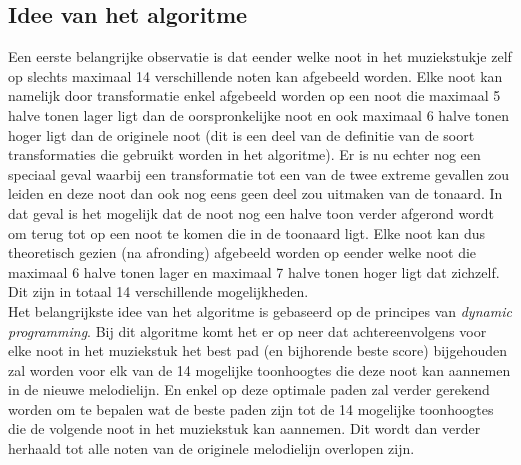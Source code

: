 \subsection{Idee van het algoritme}
Een eerste belangrijke observatie is dat eender welke noot in het muziekstukje zelf op slechts maximaal 14 verschillende noten kan afgebeeld worden. Elke noot kan namelijk door transformatie enkel afgebeeld worden op een noot die maximaal 5 halve tonen lager ligt dan de oorspronkelijke noot en ook maximaal 6 halve tonen hoger ligt dan de originele noot (dit is een deel van de definitie van de soort transformaties die gebruikt worden in het algoritme). Er is nu echter nog een speciaal geval waarbij een transformatie tot een van de twee extreme gevallen zou leiden en deze noot dan ook nog eens geen deel zou uitmaken van de tonaard. In dat geval is het mogelijk dat de noot nog een halve toon verder afgerond wordt om terug tot op een noot te komen die in de toonaard ligt. Elke noot kan dus theoretisch gezien (na afronding) afgebeeld worden op eender welke noot die maximaal 6 halve tonen lager en maximaal 7 halve tonen hoger ligt dat zichzelf. Dit zijn in totaal 14 verschillende mogelijkheden.\\
Het belangrijkste idee van het algoritme is gebaseerd op de principes van \textit{dynamic programming}. Bij dit algoritme komt het er op neer dat achtereenvolgens voor elke noot in het muziekstuk het best pad (en bijhorende beste score) bijgehouden zal worden voor elk van de 14 mogelijke toonhoogtes die deze noot kan aannemen in de nieuwe melodielijn. En enkel op deze optimale paden zal verder gerekend worden om te bepalen wat de beste paden zijn tot de 14 mogelijke toonhoogtes die de volgende noot in het muziekstuk kan aannemen. Dit wordt dan verder herhaald tot alle noten van de originele melodielijn overlopen zijn.

